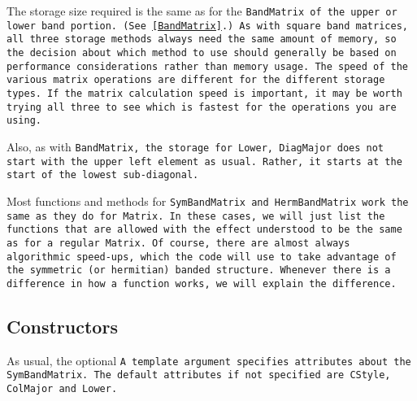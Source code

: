 The storage size required is the same as for the \tt{BandMatrix} of
the upper or lower band portion.
(See \ref{BandMatrix}.)
As with square band matrices, 
all three storage methods always need the same amount of memory, so the 
decision about which method to use should generally be based on performance 
considerations rather than memory usage.
The speed of the various matrix operations are different for the different storage 
types.  If the matrix calculation speed is important, it may be worth trying 
all three to see which is fastest for the operations you are using.

Also, as with \tt{BandMatrix}, the storage for \tt{Lower}, \tt{DiagMajor} 
does not start with the upper left element as usual.
Rather, it starts at the start of the lowest sub-diagonal.  

Most functions and methods for \tt{SymBandMatrix} and \tt{HermBandMatrix}
work the same as they do for \tt{Matrix}.
In these cases, we will just list the functions that are allowed with the
effect understood to be the same as for a regular \tt{Matrix}.  Of course, there are 
almost always algorithmic speed-ups, which the code will use to take advantage of the 
symmetric (or hermitian) banded structure.
Whenever there is a difference in how a function works,
we will explain the difference.

\subsection{Constructors}
\label{SymBandMatrix_Constructors}

As usual, the optional \tt{A} template argument specifies attributes about
the \tt{SymBandMatrix}.  The default attributes if not specified are
\tt{CStyle}, \tt{ColMajor} and \tt{Lower}.

